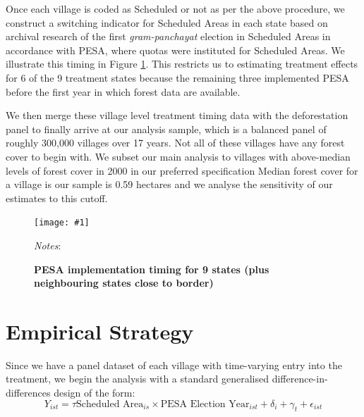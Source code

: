 \documentclass[12pt,reqno]{article}
\newcommand{\figinc}[1]{\texttt{[image: \#1]}}
\begin{document}
Once each village is coded as Scheduled or not as per the above procedure, we construct a switching indicator for Scheduled Areas in each state based on archival research of the first \emph{gram-panchayat} election in Scheduled Areas in accordance with PESA, where quotas were instituted for Scheduled Areas. We illustrate this timing in Figure \ref{fig:timing}. This restricts us to estimating treatment effects for 6 of the 9 treatment states because the remaining three implemented PESA before the first year in which forest data are available. 

We then merge these village level treatment timing data with the deforestation panel to finally arrive at our analysis sample, which is a balanced panel of roughly 300,000 villages over 17 years. Not all of these villages have any forest cover to begin with. We subset our main analysis to villages with above-median levels of forest cover in 2000 in our preferred specification Median forest cover for a village is our sample is 0.59 hectares and we analyse the sensitivity of our estimates to this cutoff.


\begin{figure}[htbp!]
\begin{center}
\begin{minipage}{1 \linewidth}
\caption{\textbf{PESA implementation timing for 9 states (plus neighbouring states close to border)} \label{fig:timing}}	
\centerline{\figinc{Output/PESA_adopt2.pdf}}
\smallskip
\scriptsize
\emph{Notes}: 
\end{minipage}
\end{center}
\end{figure}





\section{Empirical Strategy} %
\label{sec:empirical_strategy}

Since we have a panel dataset of each village with time-varying entry into the treatment, we begin the analysis with a standard generalised difference-in-differences design of the form:
\begin{equation}\label{base}
Y_{ist} = \tau \text{Scheduled Area}_{is} \times
\text{PESA Election Year}_{ist} +  \delta_i + \gamma_t +  \epsilon_{ist}
\end{equation}
\end{document}
